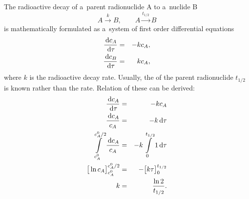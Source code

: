 The radioactive decay of a~parent radionuclide A to a~nuclide B
%
\[ A\xrightarrow{k} B, \qquad A\xrightarrow{t_{1/2}} B \]
%
is mathematically formulated as a~system of first order differential equations
%
\begin{eqnarray} \label{eqn:halflife}
  \frac{\d c_A}{\d\tau} &=& -k c_A, \\
  \frac{\d c_B}{\d\tau} &=& k c_A,
\end{eqnarray}
%
where $k$ is the radioactive decay rate. Usually, the  of the parent radionuclide $t_{1/2}$
is known rather than the rate. Relation of these can be derived:
%
\begin{eqnarray*}
    \frac{\,{\rm d} c_A}{\,{\rm d}\tau} &=& -k c_A\\
    \frac{\,{\rm d} c_A}{c_A} &=& -k \,{\rm d}\tau\\
    \int\limits_{c_A^0}^{c_A^0/2}\frac{\,{\rm d} c_A}{c_A} &=& -k\int\limits_{0}^{t_{1/2}} 1\,{\rm d}\tau\\
    \big[ \ln c_A\big]^{c_A^0/2}_{c_A^0} &=& -\big[k\tau\big]^{t_{1/2}}_{0}\\
    k &=& \frac{\ln 2}{t_{1/2}}.
\end{eqnarray*}

